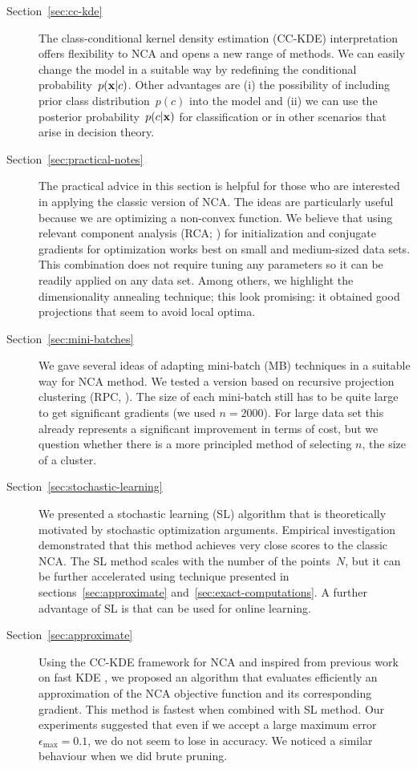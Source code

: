\begin{description}
  \item[Section~\ref{sec:cc-kde}] The class-conditional kernel density estimation (CC-KDE) interpretation offers flexibility to NCA and opens a new range of methods. We can easily change the model in a suitable way by redefining the conditional probability~$p(\mathbf{x}|c)$. Other advantages are (i) the possibility of including prior class distribution~$p(c)$ into the model and (ii) we can use the posterior probability~$p(c|\mathbf{x})$ for classification or in other scenarios that arise in decision theory.
  \item[Section~\ref{sec:practical-notes}] The practical advice in this section is helpful for those who are interested in applying the classic version of NCA\@. The ideas are particularly useful because we are optimizing a non-convex function. We believe that using relevant component analysis (RCA; \citealp{bar2003}) for initialization and conjugate gradients for optimization works best on small and medium-sized data sets. This combination does not require tuning any parameters so it can be readily applied on any data set. Among others, we highlight the dimensionality annealing technique; this look promising: it obtained good projections that seem to avoid local optima.
  \item[Section~\ref{sec:mini-batches}] We gave several ideas of adapting mini-batch (MB) techniques in a suitable way for NCA method. We tested a version based on recursive projection clustering (RPC, \citealp{chalupka2011}). The size of each mini-batch still has to be quite large to get significant gradients (we used $n=2000$). For large data set this already represents a significant improvement in terms of cost, but we question whether there is a more principled method of selecting $n$, the size of a cluster.
  \item[Section~\ref{sec:stochastic-learning}] We presented a stochastic learning (SL) algorithm that is theoretically motivated by stochastic optimization arguments. Empirical investigation demonstrated that this method achieves very close scores to the classic NCA\@. The SL method scales with the number of the points~$N$, but it can be further accelerated using technique presented in sections~\ref{sec:approximate} and~\ref{sec:exact-computations}. A further advantage of SL is that can be used for online learning.
  \item[Section~\ref{sec:approximate}] Using the CC-KDE framework for NCA and inspired from previous work on fast KDE \citep{deng1995, gray2003}, we proposed an algorithm that evaluates efficiently an approximation of the NCA objective function and its corresponding gradient. This method is fastest when combined with SL method. Our experiments suggested that even if we accept a large maximum error~$\epsilon_{\max}=0.1$, we do not seem to lose in accuracy. We noticed a similar behaviour when we did brute pruning.

\end{description}
